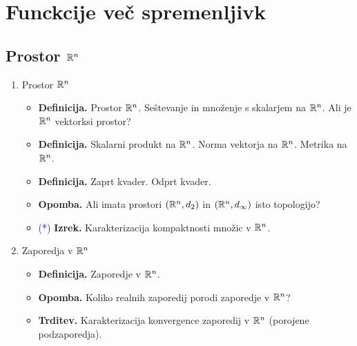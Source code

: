 \section{Funckcije več spremenljivk}
\subsection{Prostor $\mathbb{R}^n$}
\begin{enumerate}
    \item Prostor $\mathbb{R}^n$
    \begin{itemize}
        \item \textbf{Definicija.} Prostor $\mathbb{R}^n$. Seštevanje in množenje s skalarjem na $\mathbb{R}^n$. Ali je $\mathbb{R}^n$ vektorksi prostor?
        \item \textbf{Definicija.} Skalarni produkt na $\mathbb{R}^n$. Norma vektorja na $\mathbb{R}^n$. Metrika na $\mathbb{R}^n$.
        \item \textbf{Definicija.} Zaprt kvader. Odprt kvader.
        \item \textbf{Opomba.} Ali imata prostori $(\mathbb{R}^n, d_2)$ in $(\mathbb{R}^n, d_\infty)$ isto topologijo?
        \item \textcolor{blue}{(*)} \textbf{Izrek.} Karakterizacija kompaktnosti množic v $\mathbb{R}^n$.
    \end{itemize}

    \item Zaporedja v $\mathbb{R}^n$
    \begin{itemize}
        \item \textbf{Definicija.} Zaporedje v $\mathbb{R}^n$.
        \item \textbf{Opomba.} Koliko realnih zaporedij porodi zaporedje v $\mathbb{R}^n$?
        \item \textbf{Trditev.} Karakterizacija konvergence zaporedij v $\mathbb{R}^n$ (porojene podzaporedja).
    \end{itemize}
\end{enumerate}

